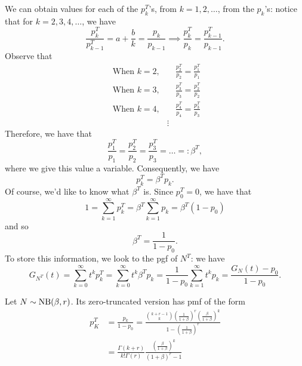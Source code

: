 \documentclass[notoc,notitlepage]{tufte-book}
\begin{document}
We can obtain values for each of the $p_k^T$'s, from $k = 1, 2, \ldots$, from the $p_k$'s: notice that for $k = 2, 3, 4, \ldots$, we have
\begin{equation*}
  \frac{p_k^T}{p_{k - 1}^T} = a + \frac{b}{k} = \frac{p_k}{p_{k - 1}} \implies \frac{p_k^T}{p_k} = \frac{p_{k - 1}^T}{p_{k - 1}}.
\end{equation*}
Observe that
\begin{align*}
  \text{ When } k = 2, &\quad \frac{p_2^T}{p_2} = \frac{p_1^T}{p_1} \\
  \text{ When } k = 3, &\quad \frac{p_3^T}{p_3} = \frac{p_2^T}{p_2} \\
  \text{ When } k = 4, &\quad \frac{p_4^T}{p_4} = \frac{p_3^T}{p_3} \\
                       &\vdots
\end{align*}
Therefore, we have that
\begin{equation*}
  \frac{p_1^T}{p_1} = \frac{p_2^T}{p_2} = \frac{p_3^T}{p_3} = \hdots =: \beta^T,
\end{equation*}
where we give this value a variable. Consequently, we have
\begin{equation*}
  p_k^T = \beta^T p_k.
\end{equation*}
Of course, we'd like to know what $\beta^T$ is. Since $p_0^T = 0$, we have that
\begin{equation*}
  1 = \sum_{k=1}^{\infty} p_k^T = \beta^T \sum_{k=1}^{\infty} p_k = \beta^T ( 1 - p_0 )
\end{equation*}
and so
\begin{equation*}
  \beta^T = \frac{1}{1 - p_0}.
\end{equation*}
To store this information, we look to the pgf of $N^T$: we have
\begin{equation*}
  G_{N^T}(t) = \sum_{k=0}^{\infty} t^k p_{k}^T= \sum_{k=0}^{\infty} t^k \beta^T p_k = \frac{1}{1 - p_0} \sum_{k=1}^{\infty} t^k p_k = \frac{G_N(t) - p_0}{1 - p_0}.
\end{equation*}

\begin{eg}
  Let $N \sim \operatorname{NB}(\beta, r)$. Its zero-truncated version has pmf of the form
  \begin{align*}
    p_K^T &= \frac{p_k}{1 - p_0} = \frac{\binom{k + r - 1}{k} \left( \frac{1}{1 + \beta} \right)^r \left( \frac{\beta}{1 + \beta} \right)^k}{1 - \left( \frac{1}{1 + \beta} \right)^r} \\
          &= \frac{\Gamma(k + r)}{k! \Gamma(r)} \frac{\left( \frac{\beta}{1 + \beta} \right)^k}{(1 + \beta)^r - 1}
  \end{align*}
\end{eg}
\end{document}
